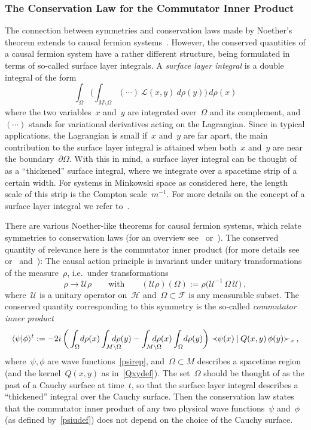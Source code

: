 \documentclass[reqno,11pt]{amsart}
\numberwithin{equation}{section}
\newcommand{\beq}{\begin{equation}}
\newcommand{\eeq}{\end{equation}}
\newcommand{\la}{\langle}
\newcommand{\ra}{\rangle}
\newcommand{\Sl}{\mbox{$\prec \!\!$ \nolinebreak}}
\newcommand{\Sr}{\mbox{\nolinebreak $\succ$}}
\newcommand{\1}{\mathds{1}}
\renewcommand{\L}{{\mathcal{L}}}
\renewcommand{\H}{\mathscr{H}}
\newcommand{\F}{{\mathscr{F}}}
\newcommand{\scrU}{{\mathscr{U}}}
\newcommand\Claudio[1]{}
\begin{document}
\subsubsection{The Conservation Law for the Commutator Inner Product} \label{secconserve}
The connection between symmetries and conservation laws made by Noether's theorem
extends to causal fermion systems~\cite{noether}. However, the conserved quantities of a causal fermion system
have a rather different structure, being formulated in terms of so-called surface layer integrals.
A {\em{surface layer integral}} is a double integral of the form
\beq \label{intdouble}
\int_\Omega \bigg( \int_{M \setminus \Omega} (\cdots)\: \L(x,y)\: d\rho(y) \bigg)\, d\rho(x)
\eeq
where the two variables~$x$ and~$y$ are integrated over~$\Omega$ and its complement,
and~$(\cdots)$ stands for variational derivatives acting on the Lagrangian.
Since in typical applications,
the Lagrangian is small if~$x$ and~$y$ are far apart, the main contribution to the
surface layer integral is attained when both~$x$ and~$y$ are near the boundary~$\partial \Omega$.
With this in mind, a surface layer integral can be thought of as a ``thickened'' surface integral,
where we integrate over a spacetime strip of a certain width. For systems in Minkowski space as considered
here, the length scale of this strip is the Compton scale~$m^{-1}$.
For more details on the concept of a surface layer integral we refer to~\cite[Section~9.1]{intro}.

There are various Noether-like theorems for causal fermion systems, which relate
symmetries to conservation laws (for an overview 
see~\cite{osi} or~\cite[Chapter~9]{intro}). The conserved quantity of relevance here is the
commutator inner product (for more details see~\cite[Section~9.4]{intro}
or~\cite[Section~5]{noether} and~\cite[Section~3]{dirac}):
The causal action principle is invariant under unitary transformations of the measure~$\rho$, i.e.\ under
transformations
\[ \rho \rightarrow \scrU \rho \qquad \text{with} \qquad
(\scrU \rho)(\Omega) := \rho \big( \scrU^{-1} \,\Omega\, \scrU \big) \:, \]
where~$\scrU$ is a unitary operator on~$\H$ and~$\Omega \subset \F$ is any measurable subset.
The conserved quantity corresponding to this symmetry is the so-called {\em{commutator inner product}}
\beq \label{cip}
\la \psi | \phi \ra^t := -2i \,\bigg( \int_{\Omega} \!d\rho(x) \int_{M \setminus \Omega} \!\!\!\!\!\!\!\!d\rho(y) 
- \int_{M \setminus \Omega} \!\!\!\!\!\!\!\!d\rho(x) \int_{\Omega} \!d\rho(y) \bigg)\:
\Sl \psi(x) \:|\: Q(x,y)\, \phi(y) \Sr_x \:,
\eeq
where~$\psi, \phi$ are wave functions~\eqref{psirep}, and~$\Omega \subset M$ describes a
spacetime region (and the kernel~$Q(x,y)$ as in~\eqref{Qxydef}).
The set~$\Omega$ should be thought of as the past of a Cauchy surface
at time~$t$, so that the surface layer integral describes a ``thickened'' integral over the Cauchy surface.\Claudio{Bildchen dazu?}%
Then the conservation law states that the commutator inner product of any two physical wave
functions~$\psi$ and~$\phi$ (as defined by~\eqref{psiudef}) does not depend on the choice of
the Cauchy surface.
\end{document}
